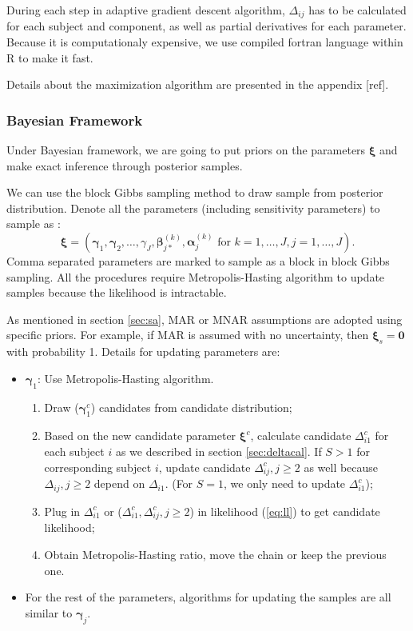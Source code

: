 \documentclass[12pt]{article}
\begin{document}
During each step in adaptive gradient descent algorithm, $\Delta_{ij}$ has
to be calculated for each subject and component, as well as partial
derivatives for each parameter. Because it is computationaly
expensive, we use compiled fortran language within R to make it fast.

Details about the maximization algorithm are presented in the appendix
[ref].

\subsubsection{Bayesian Framework}
\label{sec:bayesian}

Under Bayesian framework, we are going to put priors on the parameters
$\bm \xi$ and make exact inference through posterior samples.

We can use the block Gibbs sampling method to draw sample from
posterior distribution. Denote all the parameters (including
sensitivity parameters) to sample as : 
\begin{displaymath}
  \bm \xi = \left( \bm \gamma_1, \bm \gamma_2, \ldots, \gamma_J, 
\bm \beta_{j*}^{(k)}, \bm \alpha_j^{(k)}
    \text{ for } k = 1, \ldots, J, j = 1, \ldots, J \right).
\end{displaymath}
Comma separated parameters are marked to sample as a block in block
Gibbs sampling.  All the procedures require Metropolis-Hasting
algorithm to update samples because the likelihood is intractable.

As mentioned in section \ref{sec:sa}, MAR or MNAR assumptions are
adopted using specific priors. For example, if MAR is assumed with no
uncertainty, then $ \bm \xi _s= \bm 0$ with probability 1. Details for
updating parameters are:

\begin{itemize}
\item $\bm \gamma_{1} $: Use Metropolis-Hasting algorithm.
  \begin{enumerate}
  \item Draw ($\bm \gamma_{1}^c$) candidates from candidate
    distribution;
  \item Based on the new candidate parameter $\bm \xi^c$, calculate
    candidate $\Delta_{i1}^c$ for each subject $i$ as we described in
    section \ref{sec:deltacal}. If $S > 1$ for corresponding subject
    $i$, update candidate $\Delta_{ij}^c, j \geq 2$ as well because
    $\Delta_{ij}, j \geq 2$ depend on $\Delta_{i1}$. (For $S = 1$, we
    only need to update $\Delta_{i1}^c$);
  \item Plug in $\Delta_{i1}^c$ or ($\Delta_{i1}^c, \Delta_{ij}^c, j
    \geq 2$) in likelihood (\ref{eq:ll}) to get candidate likelihood;
  \item Obtain Metropolis-Hasting ratio, move the chain or keep the
    previous one.
  \end{enumerate}
\item For the rest of the parameters, algorithms for updating the
  samples are all similar to $\bm \gamma_j$.
\end{itemize}
\end{document}
